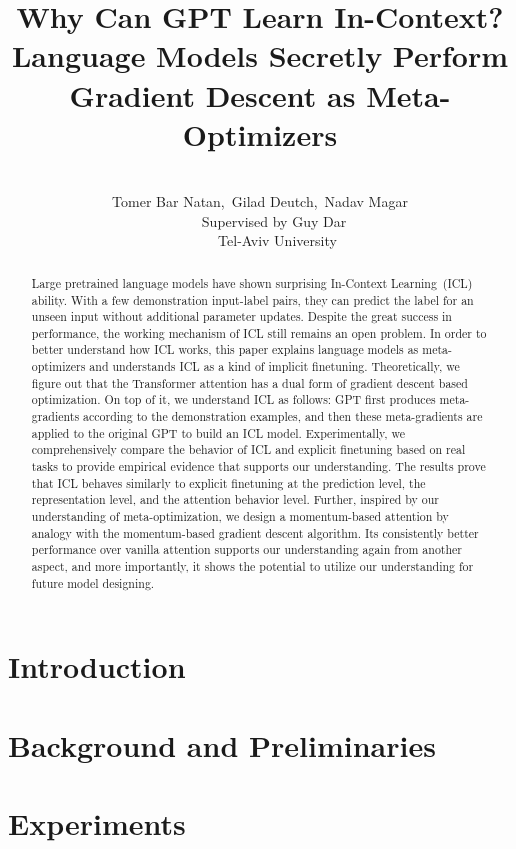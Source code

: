 \documentclass[11pt]{article}
\title{Why Can GPT Learn In-Context? \\ Language Models Secretly Perform Gradient Descent as Meta-Optimizers}
\author{\\
Tomer Bar Natan,~Gilad Deutch,~Nadav Magar\\
~~~~Supervised by Guy Dar\\
~~~~~Tel-Aviv University}
\date{}
\begin{document}
\maketitle

\begin{abstract}

	Large pretrained language models have shown surprising In-Context Learning~(ICL) ability.
	With a few demonstration input-label pairs, they can predict the label for an unseen input without additional parameter updates.
	Despite the great success in performance, the working mechanism of ICL still remains an open problem.
	In order to better understand how ICL works, this paper explains language models as meta-optimizers and understands ICL as a kind of implicit finetuning.
	Theoretically, we figure out that the Transformer attention has a dual form of gradient descent based optimization.
	On top of it, we understand ICL as follows: GPT first produces meta-gradients according to the demonstration examples, and then these meta-gradients are applied to the original GPT to build an ICL model.
	Experimentally, we comprehensively compare the behavior of ICL and explicit finetuning based on real tasks to provide empirical evidence that supports our understanding.
	The results prove that ICL behaves similarly to explicit finetuning at the prediction level, the representation level, and the attention behavior level.
	Further, inspired by our understanding of meta-optimization, we design a momentum-based attention by analogy with the momentum-based gradient descent algorithm.
	Its consistently better performance over vanilla attention supports our understanding again from another aspect, and more importantly, it shows the potential to utilize our understanding for future model designing.

\end{abstract}

\section{Introduction}


\section{Background and Preliminaries}



\section{Experiments}
\end{document}
